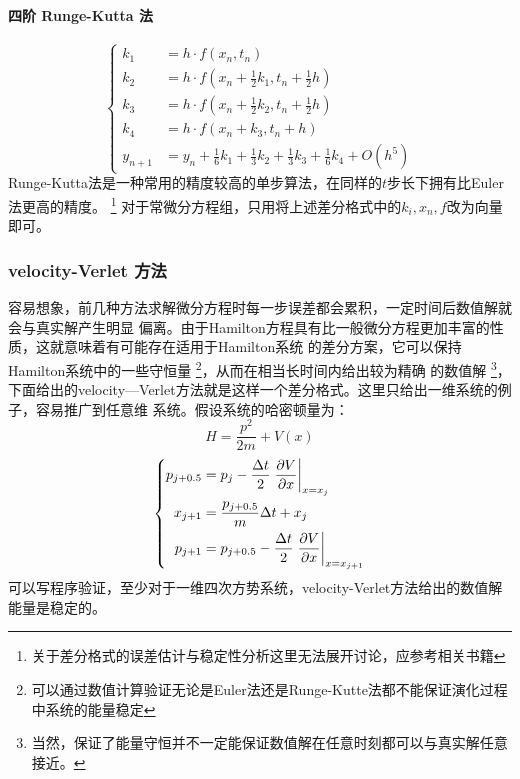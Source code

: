     \paragraph{四阶 Runge-Kutta 法}
    \begin{equation}
        \left\{
            \begin{split}
                k_1 &= h\cdot f(x_n, t_n)\\
                k_2 &= h\cdot f(x_n + \frac{1}{2}k_1, t_n + \frac{1}{2}h)\\
                k_3 &= h\cdot f(x_n + \frac{1}{2}k_2, t_n + \frac{1}{2}h)\\
                k_4 &= h\cdot f(x_n + k_3, t_n + h)\\
                y_{n + 1} &= y_n + \frac{1}{6}k_1 + \frac{1}{3}k_2 + \frac{1}{3}k_3 + \frac{1}{6}k_4 + O(h^5)
            \end{split}
        \right.
    \end{equation}
    Runge-Kutta法是一种常用的精度较高的单步算法，在同样的$t$步长下拥有比Euler法更高的精度。
    \footnote{
        关于差分格式的误差估计与稳定性分析这里无法展开讨论，应参考相关书籍
    }
    对于常微分方程组，只用将上述差分格式中的$k_i, x_n, f$改为向量即可。
    \subsubsection{velocity-Verlet 方法}
    容易想象，前几种方法求解微分方程时每一步误差都会累积，一定时间后数值解就会与真实解产生明显
    偏离。由于Hamilton方程具有比一般微分方程更加丰富的性质，这就意味着有可能存在适用于Hamilton系统
    的差分方案，它可以保持Hamilton系统中的一些守恒量
    \footnote{
        可以通过数值计算验证无论是Euler法还是Runge-Kutte法都不能保证演化过程中系统的能量稳定
    }，从而在相当长时间内给出较为精确
    的数值解
    \footnote{
        当然，保证了能量守恒并不一定能保证数值解在任意时刻都可以与真实解任意接近。
    }，下面给出的velocity—Verlet方法就是这样一个差分格式。这里只给出一维系统的例子，容易推广到任意维
    系统。假设系统的哈密顿量为：
    \begin{equation}
        H = \frac{p^2}{2m} + V(x)
    \end{equation}
    \begin{equation}
        \left\{
            \begin{split}
                p_{j+0.5} &= p_j - \frac{\Delta t}{2}\left.\frac{\partial{V}}{\partial{x}}\right|_{x = x_j}\\
                x_{j+1} &= \frac{p_{j+0.5}}{m}\Delta t + x_{j}\\
                p_{j+1} &= p_{j+0.5} - \frac{\Delta t}{2}\left.\frac{\partial{V}}{\partial{x}}\right|_{x=x_{j+1}}
            \end{split}
        \right.
    \end{equation}
    可以写程序验证，至少对于一维四次方势系统，velocity-Verlet方法给出的数值解能量是稳定的。
